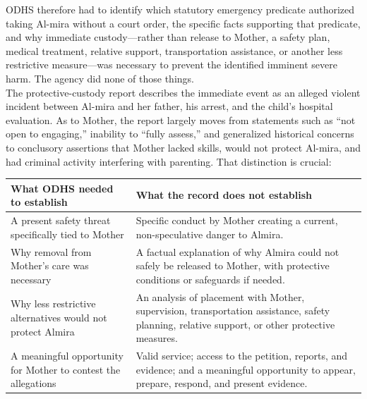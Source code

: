 \documentclass[10pt,a4paper,roman]{moderncv}
\begin{document}
	\noindent ODHS therefore had to identify which statutory emergency predicate authorized taking Al-mira without a court order, the specific facts supporting that predicate, and why immediate custody---rather than release to Mother, a safety plan, medical treatment, relative support, transportation assistance, or another less restrictive measure---was necessary to prevent the identified imminent severe harm. The agency did none of those things.\\
	
	The protective-custody report describes the immediate event as an alleged violent incident between Al-mira and her father, his arrest, and the child's hospital evaluation. As to Mother, the report largely moves from statements such as ``not open to engaging,'' inability to ``fully assess,'' and generalized historical concerns to conclusory assertions that Mother lacked skills, would not protect Al-mira, and had criminal activity interfering with parenting. That distinction is crucial:
	
	\begin{center}
		\renewcommand{\arraystretch}{.90}
		\begin{tabular}{@{}p{}@{\hspace{9pt}}p{}@{}}
			\hline
			\textbf{What ODHS needed to establish} &
			\textbf{What the record does not establish} \\
			\hline
			A present safety threat specifically tied to Mother &
			Specific conduct by Mother creating a current, non-speculative danger to Almira. \\
			\hline
			Why removal from Mother's care was necessary &
			A factual explanation of why Almira could not safely be released to Mother, with protective conditions or safeguards if needed. \\
			\hline
			Why less restrictive alternatives would not protect Almira &
			An analysis of placement with Mother, supervision, transportation assistance, safety planning, relative support, or other protective measures. \\
			\hline
			A meaningful opportunity for Mother to contest the allegations &
			Valid service; access to the petition, reports, and evidence; and a meaningful opportunity to appear, prepare, respond, and present evidence. \\
			\hline
		\end{tabular}
	\end{center}
	
\end{document}
